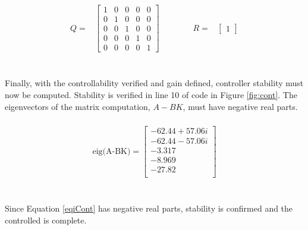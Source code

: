 \documentclass[12pt]{article}
\begin{document}
\begin{equation}
\begin{aligned}
\label{qnr}
Q =& 
\begin{bmatrix} 1 & 0 & 0 & 0 & 0\\ 0 & 1 & 0 & 0 & 0 \\ 0 & 0 & 1 & 0 & 0 \\ 0 & 0 & 0 & 1 & 0 \\ 0 & 0 & 0 & 0 & 1\end{bmatrix}
\qquad \qquad
R =&
\begin{bmatrix} 1\end{bmatrix}
\end{aligned}
\end{equation}
\\ \\
Finally, with the controllability verified and gain defined, controller stability must now be computed. Stability is verified in line 10 of code in Figure \ref{fig:cont}. The eigenvectors of the matrix computation,  $A-BK$, must have negative real parts.
\\ \\
\begin{equation} \label{eqiCont} \begin{aligned}
\textrm{eig(A-BK)} = \begin{bmatrix}-62.44 +57.06i\\ -62.44 -57.06i\\ -3.317\\ -8.969\\ -27.82\\
\end{bmatrix} \end{aligned} \end{equation}
\\ \\
Since Equation \eqref{eqiCont} has negative real parts, stability is confirmed and the controlled is complete.
\end{document}
